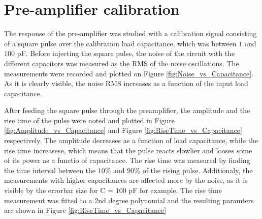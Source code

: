 \documentclass[12pt]{article}
\begin{document}
%
%

\section{Pre-amplifier calibration}

The response of the pre-amplifier was studied with a calibration signal consisting of a square pulse over the calibration load capacitance, which was between $1$ and $100$ pF. 
Before injecting the square pulse, the noise of the circuit with the different capacitors was measured as the RMS of the noise oscillations. The measurements were recorded and plotted on Figure \ref{fig:Noise_vs_Capacitance}. As it is clearly visible, the noise RMS increases as a function of the input load capacitance.


After feeding the square pulse through the preamplifier, the amplitude and the rise time of the pulse were noted and plotted in Figure \ref{fig:Amplitude_vs_Capacitance} and Figure \ref{fig:RiseTime_vs_Capacitance} respectively. The amplitude decreases as a function of load capacitance, while the rise time increasese, which means that the pulse reacts slowlier and looses some of its power as a functio of capacitance. The rise time was measured by finding the time interval between the $10\%$ and $90\%$ of the rising pulse. 
Additionaly, the measurements with higher capacitances are affected more by the noise, as it is visible by the errorbar size for C = $100$ pF for example. The rise time measurement was fitted to a $2$nd degree polynomial and the resulting paramters are shown in Figure \ref{fig:RiseTime_vs_Capacitance} 
\end{document}

